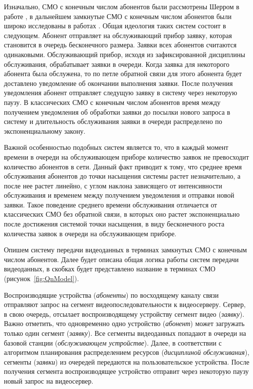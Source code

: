 Изначально, СМО с конечным числом абонентов были рассмотрены Шерром в работе \cite{scherr}, в дальнейшем замкнутые СМО с конечным числом абонентов были широко исследованы в работах \cite{adiri, simha, veran}. Общая идеология таких систем состоит в следующем. Абонент отправляет на обслуживающий прибор заявку, которая становится в очередь бесконечного размера. Заявки всех абонентов считаются одинаковыми. Обслуживающий прибор, исходя из зафиксированной дисциплины обслуживания, обрабатывает заявки в очереди. Когда заявка для некоторого абонента была обслужена, то по петле обратной связи для этого абонента будет доставлено уведомление об окончании выполнения заявки. После получения уведомления абонент отправляет следущую заявку в систему через некоторую паузу. В классических СМО с конечным числом абонентов время между получением уведомления об обработки заявки до посылки нового запроса в систему и длительность обслуживания заявки в очереди распределено по экспоненциальному закону.

Важной особенностью подобных систем является то, что в каждый момент времени в очереди на обслуживающем приборе количество заявок не превосходит количество абонентов в сети. Данный факт приводит к тому, что среднее время обслуживания абонентов до точки насыщения системы растет незначительно, а после нее растет линейно, с углом наклона зависящего от интенсивности обслуживания и временем между получением уведомления и отправки новой заявки. Такое поведение среднего времени обслуживания отличается от классических СМО без обратной связи, в которых оно растет экспоненциально после достижения системой точки насыщения, в виду бесконечного роста количества заявок в очереди на обслуживающем приборе.

Опишем систему передачи видеоданных в терминах замкнутых СМО с конечным числом абонентов. Далее будет описана общая логика работы систем передачи видеоданных, в скобках будет представлено название в терминах CМО (рисунок~\ref{fig:QnModel}).

Воспроизводящие устройства (\textit{абоненты}) по восходящему каналу связи отправляют запрос на сегмент видеопоследовательности к видеосерверу. Сервер, в свою очередь, отсылает воспроизводящему устройству сегмент видео (\textit{заявку}). Важно отметить, что одновременно одно устройство (\textit{абонент}) может загружать только один сегмент (\textit{заявку}). Все сегменты видеоданных попадают в очереди на базовой станции (\textit{обслуживающем устройстве}). Далее, в соответствии с алгоритмом планирования распределением ресурсов (\textit{дисциплиной обслуживания}), сегменты (\textit{заявки}) из очередей передаются на пользовательское устройства. После получения сегмента воспроизводящее устройство отправит через некоторую паузу новый запрос на видеосервер.


